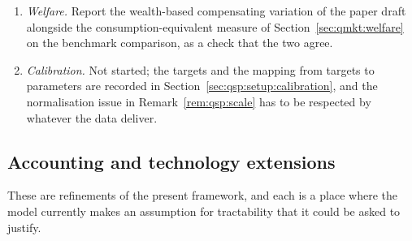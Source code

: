 \begin{enumerate}[leftmargin=2.2em,itemsep=0.25em]
\item \emph{Welfare.} Report the wealth-based compensating variation of the paper draft alongside the
consumption-equivalent measure of Section~\ref{sec:qmkt:welfare} on the benchmark comparison, as a
check that the two agree.

\item \emph{Calibration.} Not started; the targets and the mapping from targets to parameters are
recorded in Section~\ref{sec:qsp:setup:calibration}, and the normalisation issue in
Remark~\ref{rem:qsp:scale} has to be respected by whatever the data deliver.
\end{enumerate}

\subsection{Accounting and technology extensions}\label{sec:app:ext:accounting}

These are refinements of the present framework, and each is a place where the model currently makes an
assumption for tractability that it could be asked to justify.

